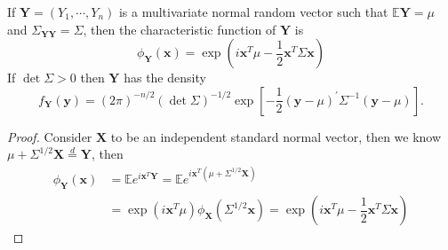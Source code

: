 \begin{proposition}
    If $\textbf{Y} = (Y_1 , \cdots , Y_n)$ is a multivariate normal random vector such that $\mathbb{E}\textbf{Y} = \mu$ and $\Sigma_{\textbf{Y}\textbf{Y}} = \Sigma$, then the characteristic function of $\textbf{Y}$ is
    \[
    \phi_{\textbf{Y}}(\textbf{x}) = \exp\left(i\textbf{x}^T\mu - \dfrac{1}{2}\textbf{x}^T\Sigma\textbf{x}\right)
    \]
    If $\det \Sigma > 0$ then $\textbf{Y}$ has the density
    \[
f_{\mathbf{Y}}(\mathbf{y})
=
(2\pi)^{-n/2}
(\det{\Sigma})^{-1/2}
\exp\left[
-\frac{1}{2}
(\mathbf{y}-{\mu})^\prime
{\Sigma}^{-1}
(\mathbf{y}-{\mu})
\right].
\tag{1.6.12}
\]
\end{proposition}
\begin{proof}
    Consider $\textbf{X}$ to be an independent standard normal vector, then we know $\mu + \Sigma^{1/2}\textbf{X} \overset{d}{=} \textbf{Y}$, then
    \[
    \begin{aligned}
        \phi_{\textbf{Y}}(\textbf{x}) &= \mathbb{E} e^{i\textbf{x}^T\textbf{Y}} 
        = \mathbb{E} e^{i\textbf{x}^T(\mu + \Sigma^{1/2}\textbf{X})} \\
        &= \exp(i\textbf{x}^T\mu)\phi_{\textbf{X}}(\Sigma^{1/2}\textbf{x}) = \exp\left(i\textbf{x}^T\mu - \dfrac{1}{2}\textbf{x}^T\Sigma\textbf{x}\right)
    \end{aligned}
    \]
    
\end{proof}

\newpage
